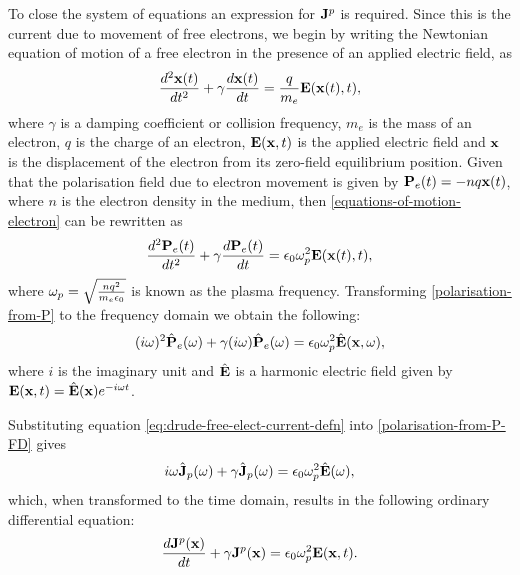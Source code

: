 To close the system of equations an expression for $\mathbf{J}^p$ is required. Since this is the current due to movement of free electrons, we begin by writing the Newtonian equation of motion of a free electron in the presence of an applied electric field, as
\begin{equation}
\frac{d^2 \mathbf{x}(t) }{dt^2}+ \gamma \frac{d \mathbf{x}(t) }{dt}= \frac{q}{m_e}\mathbf{E}(\mathbf{x}(t),t),
\label{equations-of-motion-electron}
\end{equation}
where $\gamma$ is a damping coefficient or collision frequency, $m_e$ is the mass of an electron, $q$ is the charge of an electron, $\mathbf{E}(\mathbf{x},t)$ is the applied electric field and $\mathbf{x}$ is the displacement of the electron from its zero-field equilibrium position. Given that the polarisation field due to electron movement is given by $ \mathbf{P}_e(t) = - n q \mathbf{x}(t)$, where $n$ is the electron density in the medium, then \eqref{equations-of-motion-electron} can be rewritten as
\begin{equation}
\label{polarisation-from-P}
\frac{d^2 \mathbf{P}_e(t) }{dt^2} + \gamma \frac{d \mathbf{P}_e(t) }{dt} = \epsilon_0 \omega_p^2 \mathbf{E}(\mathbf{x}(t),t),
\end{equation}
where $\omega_p = \sqrt{\frac{n q^2}{m_e \epsilon_0}}$ is known as the plasma frequency.
%
Transforming \eqref{polarisation-from-P} to the frequency domain we obtain the following:
\begin{equation}
\label{polarisation-from-P-FD}
( i \omega )^2 \hat{\mathbf{P}}_e(\omega) + \gamma (i \omega) \hat{\mathbf{P}}_e(\omega) = \epsilon_0 \omega_p^2 \hat{\mathbf{E}}(\mathbf{x},\omega),
\end{equation}
where $i$ is the imaginary unit and $\hat{\mathbf{E}}$ is a harmonic electric field given by $\mathbf{E}(\mathbf{x},t) = \hat{\mathbf{E}}(\mathbf{x}) e^{- i \omega t }$.

Substituting equation \eqref{eq:drude-free-elect-current-defn} into \eqref{polarisation-from-P-FD} gives
\begin{equation}
    \label{eq:pol-current-freq-domain}
  i \omega \hat{\mathbf{J}}_p(\omega) + \gamma \hat{\mathbf{J}}_p(\omega) = \epsilon_0 \omega_p^2 \hat{\mathbf{E}}(\omega) ,
\end{equation}
which, when transformed to the time domain, results in the following ordinary differential equation:
\begin{equation}
  \frac{d \mathbf{J}^p(\mathbf{x})}{dt} + \gamma \mathbf{J}^p(\mathbf{x}) = \epsilon_0 \omega_p^2 \mathbf{E}(\mathbf{x},t).
  \label{pol-current-ADE}
\end{equation}


